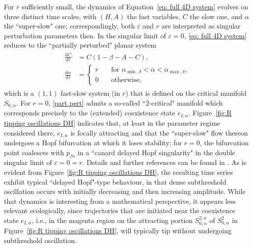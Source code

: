 \documentclass{article}
\theoremstyle{definition}
\numberwithin{equation}{section}
\newcommand{\dd}{\mathrm{d}}
\begin{document}
For $r$ sufficiently small, the dynamics of Equation~\eqref{eq: full 4D system} evolves on three distinct time scales, with $(H,A)$ the fast variables, $C$ the slow one, and $\alpha$ the ``super-slow" one; correspondingly, both $\varepsilon$ and $r$ are interpreted as singular perturbation parameters then. In the singular limit of $\varepsilon=0$, \eqref{eq: full 4D system} reduces to the ``partially perturbed" planar system
\begin{align}\label{part pert}
\begin{split}
\frac{\dd C}{\dd \tau} &= C(1-\beta-A-C),\\
    \frac{\dd \alpha}{\dd \tau} &=\begin{cases}
        r & \quad\text{for } \alpha_{\min,\delta}< \alpha < \alpha_{\max,\delta},\\
        0 & \quad \mathrm{otherwise},
        \end{cases}
\end{split}
\end{align}
which is a $(1,1)$ fast-slow system (in $r$) that is defined on the critical manifold $S_{0,\alpha}$. For $r=0$, \eqref{part pert} admits a so-called ``2-critical" manifold which corresponds precisely to the (extended) coexistence state $e_{I,\alpha}$. Figure~\ref{fig:R tipping oscillations DH} indicates that, at least in the parameter regime considered there, $e_{I,\alpha}$ is focally attracting and that the ``super-slow" flow thereon undergoes a Hopf bifurcation at which it loses stability; for $r=0$, the bifurcation point coalesces with $p_{fn}$ in a ``canard delayed Hopf singularity" in the double singular limit of $\varepsilon=0=r$. Details and further references can be found in \cite{6c8c3bfcb06e4fb8b0cd94ae49d0c15b}.  As is evident from Figure~\ref{fig:R tipping oscillations DH}, the resulting time series exhibit typical ``delayed Hopf"-type behaviour, in that dense subthreshold oscillation occurs with initially decreasing and then increasing amplitude. While that dynamics is interesting from a mathematical perspective, it appears less relevant ecologically, since trajectories that are initiated near the coexistence state $e_{I,\alpha}$, i.e., in the magenta region on the attracting portion $S_{0,\alpha}^{2,a}$ of $S_{0,\alpha}^2$ in Figure~\ref{fig:R tipping oscillations DH}, will typically tip without undergoing subthreshold oscillation.
\end{document}
